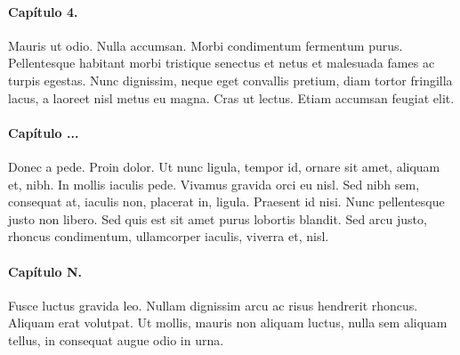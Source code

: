 \paragraph*{Capítulo 4.}
Mauris ut odio. Nulla accumsan. Morbi condimentum fermentum purus. Pellentesque habitant morbi tristique senectus et netus et malesuada fames ac turpis egestas. Nunc dignissim, neque eget convallis pretium, diam tortor fringilla lacus, a laoreet nisl metus eu magna. Cras ut lectus. Etiam accumsan feugiat elit.

\paragraph*{Capítulo ...}
Donec a pede. Proin dolor. Ut nunc ligula, tempor id, ornare sit amet, aliquam et, nibh. In mollis iaculis pede. Vivamus gravida orci eu nisl. Sed nibh sem, consequat at, iaculis non, placerat in, ligula. Praesent id nisi. Nunc pellentesque justo non libero. Sed quis est sit amet purus lobortis blandit. Sed arcu justo, rhoncus condimentum, ullamcorper iaculis, viverra et, nisl.

\paragraph*{Capítulo N.}
Fusce luctus gravida leo. Nullam dignissim arcu ac risus hendrerit rhoncus. Aliquam erat volutpat. Ut mollis, mauris non aliquam luctus, nulla sem aliquam tellus, in consequat augue odio in urna.




